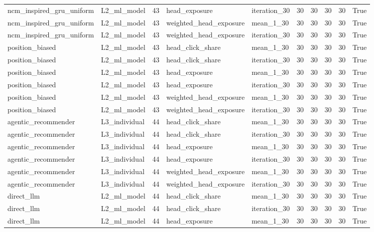 \begin{table}[htbp!]
\begin{tabular}{llrllrrrrr}
ncm\_inspired\_gru\_uniform & L2\_ml\_model & 43 & head\_exposure & iteration\_30 & 30 & 30 & 30 & 30 & True \\
ncm\_inspired\_gru\_uniform & L2\_ml\_model & 43 & weighted\_head\_exposure & mean\_1\_30 & 30 & 30 & 30 & 30 & True \\
ncm\_inspired\_gru\_uniform & L2\_ml\_model & 43 & weighted\_head\_exposure & iteration\_30 & 30 & 30 & 30 & 30 & True \\
position\_biased & L2\_ml\_model & 43 & head\_click\_share & mean\_1\_30 & 30 & 30 & 30 & 30 & True \\
position\_biased & L2\_ml\_model & 43 & head\_click\_share & iteration\_30 & 30 & 30 & 30 & 30 & True \\
position\_biased & L2\_ml\_model & 43 & head\_exposure & mean\_1\_30 & 30 & 30 & 30 & 30 & True \\
position\_biased & L2\_ml\_model & 43 & head\_exposure & iteration\_30 & 30 & 30 & 30 & 30 & True \\
position\_biased & L2\_ml\_model & 43 & weighted\_head\_exposure & mean\_1\_30 & 30 & 30 & 30 & 30 & True \\
position\_biased & L2\_ml\_model & 43 & weighted\_head\_exposure & iteration\_30 & 30 & 30 & 30 & 30 & True \\
agentic\_recommender & L3\_individual & 44 & head\_click\_share & mean\_1\_30 & 30 & 30 & 30 & 30 & True \\
agentic\_recommender & L3\_individual & 44 & head\_click\_share & iteration\_30 & 30 & 30 & 30 & 30 & True \\
agentic\_recommender & L3\_individual & 44 & head\_exposure & mean\_1\_30 & 30 & 30 & 30 & 30 & True \\
agentic\_recommender & L3\_individual & 44 & head\_exposure & iteration\_30 & 30 & 30 & 30 & 30 & True \\
agentic\_recommender & L3\_individual & 44 & weighted\_head\_exposure & mean\_1\_30 & 30 & 30 & 30 & 30 & True \\
agentic\_recommender & L3\_individual & 44 & weighted\_head\_exposure & iteration\_30 & 30 & 30 & 30 & 30 & True \\
direct\_llm & L2\_ml\_model & 44 & head\_click\_share & mean\_1\_30 & 30 & 30 & 30 & 30 & True \\
direct\_llm & L2\_ml\_model & 44 & head\_click\_share & iteration\_30 & 30 & 30 & 30 & 30 & True \\
direct\_llm & L2\_ml\_model & 44 & head\_exposure & mean\_1\_30 & 30 & 30 & 30 & 30 & True \\

\end{tabular}
\end{table}

